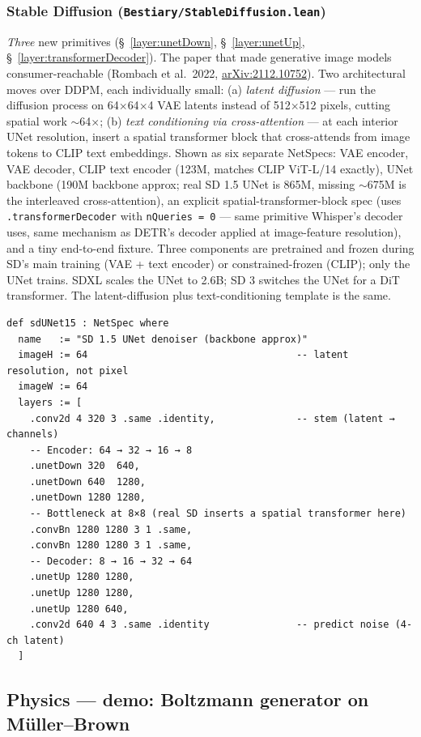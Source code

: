 \subsubsection*{Stable Diffusion (\texttt{Bestiary/StableDiffusion.lean})}
\emph{Three} new primitives (\S~\ref{layer:unetDown}, \S~\ref{layer:unetUp}, \S~\ref{layer:transformerDecoder}). The paper that made generative image
models consumer-reachable (Rombach et al.\ 2022,
\href{https://arxiv.org/abs/2112.10752}{arXiv:2112.10752}). Two architectural
moves over DDPM, each individually small: (a) \emph{latent diffusion}
--- run the diffusion process on 64$\times$64$\times$4 VAE latents
instead of 512$\times$512 pixels, cutting spatial work $\sim$64$\times$;
(b) \emph{text conditioning via cross-attention} --- at each interior
UNet resolution, insert a spatial transformer block that cross-attends
from image tokens to CLIP text embeddings. Shown as six separate
NetSpecs: VAE encoder, VAE decoder, CLIP text encoder (123M, matches
CLIP ViT-L/14 exactly), UNet backbone (190M backbone approx; real
SD 1.5 UNet is 865M, missing $\sim$675M is the interleaved
cross-attention), an explicit spatial-transformer-block spec (uses
\texttt{.transformerDecoder} with \texttt{nQueries = 0} --- same
primitive Whisper's decoder uses, same mechanism as DETR's decoder
applied at image-feature resolution), and a tiny end-to-end fixture.
Three components are pretrained and frozen during SD's main training
(VAE + text encoder) or constrained-frozen
(CLIP); only the UNet trains. SDXL scales the UNet to 2.6B; SD 3
switches the UNet for a DiT transformer. The latent-diffusion plus
text-conditioning template is the same.

\begin{verbatim}
def sdUNet15 : NetSpec where
  name   := "SD 1.5 UNet denoiser (backbone approx)"
  imageH := 64                                    -- latent resolution, not pixel
  imageW := 64
  layers := [
    .conv2d 4 320 3 .same .identity,              -- stem (latent → channels)
    -- Encoder: 64 → 32 → 16 → 8
    .unetDown 320  640,
    .unetDown 640  1280,
    .unetDown 1280 1280,
    -- Bottleneck at 8×8 (real SD inserts a spatial transformer here)
    .convBn 1280 1280 3 1 .same,
    .convBn 1280 1280 3 1 .same,
    -- Decoder: 8 → 16 → 32 → 64
    .unetUp 1280 1280,
    .unetUp 1280 1280,
    .unetUp 1280 640,
    .conv2d 640 4 3 .same .identity               -- predict noise (4-ch latent)
  ]
\end{verbatim}

\subsection{Physics --- demo: Boltzmann generator on M\"uller--Brown}
\label{sec:bestiary_boltzmann}

